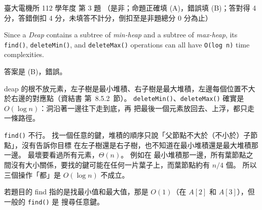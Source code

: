 \begin{pastexam}[label={px:ntu-112-ee-ds-03}]{臺大電機所 112 學年度 第 3 題}
（是非；命題正確填 (A)，錯誤填 (B)；答對得 4 分，答錯倒扣 4 分，未填答不計分，倒扣至是非題總分 0 分為止）

Since a \textit{Deap} contains a subtree of \textit{min-heap} and a subtree of \textit{max-heap}, its \texttt{find()}, \texttt{deleteMin()}, and \texttt{deleteMax()} operations can all have \texttt{O(log n)} time complexities.
\end{pastexam}

\begin{pastsoln}
答案是 (B)，錯誤。

deap 的根不放元素，左子樹是最小堆積、右子樹是最大堆積，左邊每個位置不大於右邊的對應點（資結書
第~8.5.2~節）。 \texttt{deleteMin()}、\texttt{deleteMax()} 確實是 $O(\log n)$：洞沿著一邊往下走到底，再
把最後一個元素放回去、上浮，都只走一條路徑。

\texttt{find()} 不行。 找一個任意的鍵，堆積的順序只說「父節點不大於（不小於）子節點」，沒有告訴你目標
在左子樹還是右子樹，也不知道在最小堆積還是最大堆積那一邊。 最壞要看過所有元素，$\Theta(n)$。 例如在
最小堆積那一邊，所有葉節點之間沒有大小關係，要找的鍵可能在任何一片葉子上，而葉節點約有 $n/4$ 個。
所以三個操作「都」是 $O(\log n)$ 不成立。

若題目的 find 指的是找最小值和最大值，那是 $O(1)$（在 $A[2]$ 和 $A[3]$），但一般的 \texttt{find()} 是
搜尋任意鍵。
\end{pastsoln}
